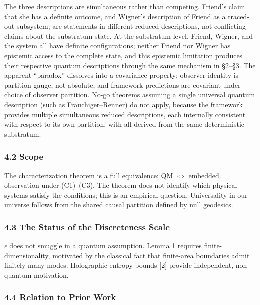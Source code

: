 \documentclass[
]{article}
\begin{document}
The three descriptions are simultaneous rather than competing. Friend's
claim that she has a definite outcome, and Wigner's description of
Friend as a traced-out subsystem, are statements in different reduced
descriptions, not conflicting claims about the substratum state. At the
substratum level, Friend, Wigner, and the system all have definite
configurations; neither Friend nor Wigner has epistemic access to the
complete state, and this epistemic limitation produces their respective
quantum descriptions through the same mechanism in §2--§3. The apparent
``paradox'' dissolves into a covariance property: observer identity is
partition-gauge, not absolute, and framework predictions are covariant
under choice of observer partition. No-go theorems assuming a single
universal quantum description (such as Frauchiger--Renner) do not apply,
because the framework provides multiple simultaneous reduced
descriptions, each internally consistent with respect to its own
partition, with all derived from the same deterministic substratum.

\hypertarget{scope}{%
\subsubsection{4.2 Scope}\label{scope}}

The characterization theorem is a full equivalence: QM \(\iff\) embedded
observation under (C1)--(C3). The theorem does not identify which
physical systems satisfy the conditions; this is an empirical question.
Universality in our universe follows from the shared causal partition
defined by null geodesics.

\hypertarget{the-status-of-the-discreteness-scale}{%
\subsubsection{4.3 The Status of the Discreteness
Scale}\label{the-status-of-the-discreteness-scale}}

\(\epsilon\) does not smuggle in a quantum assumption. Lemma 1 requires
finite-dimensionality, motivated by the classical fact that finite-area
boundaries admit finitely many modes. Holographic entropy bounds {[}2{]}
provide independent, non-quantum motivation.

\hypertarget{relation-to-prior-work}{%
\subsubsection{4.4 Relation to Prior
Work}\label{relation-to-prior-work}}
\end{document}
